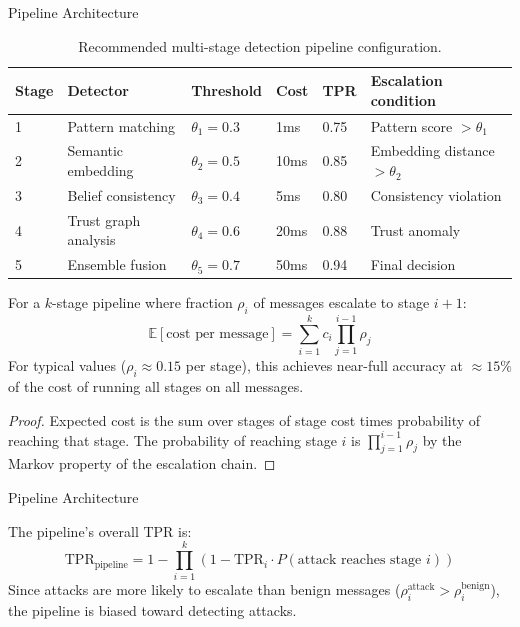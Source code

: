 \documentclass[
  ignorenonframetext,
]{beamer}
\begin{document}
\begin{frame}[allowframebreaks]{Pipeline Architecture}
\begin{table}[htbp]
\centering
\caption{Recommended multi-stage detection pipeline configuration.}
\label{tab:pipeline-stages}
\begin{tabular}{@{}lllllp{3cm}@{}}
\toprule
Stage & Detector & Threshold & Cost & TPR & Escalation condition \\
\midrule
1 & Pattern matching & $\theta_1 = 0.3$ & 1ms & 0.75 & Pattern score $> \theta_1$ \\
2 & Semantic embedding & $\theta_2 = 0.5$ & 10ms & 0.85 & Embedding distance $> \theta_2$ \\
3 & Belief consistency & $\theta_3 = 0.4$ & 5ms & 0.80 & Consistency violation \\
4 & Trust graph analysis & $\theta_4 = 0.6$ & 20ms & 0.88 & Trust anomaly \\
5 & Ensemble fusion & $\theta_5 = 0.7$ & 50ms & 0.94 & Final decision \\
\bottomrule
\end{tabular}
\end{table}

\begin{theorem}
\label{thm:pipeline-efficiency}
For a $k$-stage pipeline where fraction $\rho_i$ of messages escalate to stage $i+1$:
\begin{equation}
\label{eq:pipeline-cost}
\mathbb{E}[\text{cost per message}] = \sum_{i=1}^{k} c_i \prod_{j=1}^{i-1} \rho_j
\end{equation}
For typical values ($\rho_i \approx 0.15$ per stage), this achieves near-full accuracy at $\approx 15\%$ of the cost of running all stages on all messages.
\end{theorem}

\begin{proof}
Expected cost is the sum over stages of stage cost times probability of reaching that stage. The probability of reaching stage $i$ is $\prod_{j=1}^{i-1} \rho_j$ by the Markov property of the escalation chain.
\end{proof}

\end{frame}

\begin{frame}[allowframebreaks]{Pipeline Architecture}
\begin{theorem}
\label{thm:pipeline-tpr}
The pipeline's overall TPR is:
\begin{equation}
\label{eq:pipeline-tpr}
\text{TPR}_{\text{pipeline}} = 1 - \prod_{i=1}^{k}(1 - \text{TPR}_i \cdot P(\text{attack reaches stage } i))
\end{equation}
Since attacks are more likely to escalate than benign messages ($\rho_i^{\text{attack}} > \rho_i^{\text{benign}}$), the pipeline is biased toward detecting attacks.
\end{theorem}
\end{frame}
\end{document}
